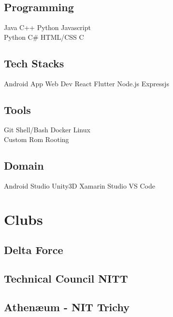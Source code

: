 \documentclass[]{deedy-resume-openfont}
\begin{document}
\begin{minipage}[t]{0.3\textwidth}
\subsection{Programming}
Java \textbullet{}   C++ \textbullet{} Python \textbullet{} Javascript \\
Python \textbullet{} C\# \textbullet{} HTML/CSS \textbullet{} C \\ 
\subsection{Tech Stacks}
Android App \textbullet{}   Web Dev \textbullet{} React \textbullet{} Flutter
Node.js \textbullet{} Expressjs \\ 
\subsection{Tools}
Git \textbullet{}   Shell/Bash \textbullet{} Docker \textbullet{} Linux \\
Custom Rom \textbullet{} Rooting \\ 
\subsection{Domain}
Android Studio \textbullet{}   Unity3D \textbullet{} Xamarin Studio \textbullet{} VS Code \\ 
\sectionsep
%
%
\section{Clubs}
\subsection{Delta Force}
\sectionsep

\subsection{Technical Council NITT}
\sectionsep

\subsection{Athenæum - NIT Trichy}
\sectionsep


\end{minipage}
\end{document}
